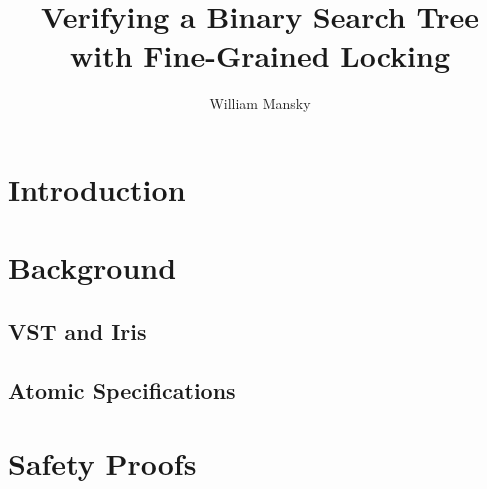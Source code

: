 \documentclass[11pt]{article} %
\title{Verifying a Binary Search Tree with Fine-Grained Locking }
\author{William Mansky}
\date{} %
\begin{document}
\maketitle

\section{Introduction}

\section{Background}
\subsection{VST and Iris}
\subsection{Atomic Specifications}

\section{Safety Proofs}
\end{document}
